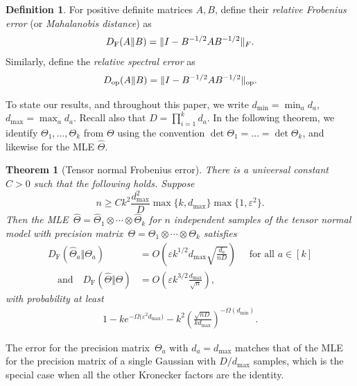 \documentclass[aos]{imsart}
\newtheorem{theorem}{Theorem}[section]
\theoremstyle{definition}
\newtheorem*{definition}{Definition}
\numberwithin{equation}{section}
\DeclareMathOperator{\op}{op}
\DeclarePairedDelimiter{\norm}{\lVert}{\rVert}
\newcommand{\htheta}{\widehat{\Theta}}
\newcommand{\ot}{\otimes}
\newcommand{\eps}{\varepsilon}
\newcommand{\DF}{D_{\operatorname{F}}}
\newcommand{\Dop}{D_{\operatorname{op}}}
\def\dmax{d_{\max}}
\begin{document}
\begin{definition}
For positive definite matrices $A, B$, define their \emph{relative Frobenius error} (or \emph{Mahalanobis distance}) as
\begin{align}\label{eq:def D_F}
  \DF(A \Vert B) = \norm{I - B^{-1/2} A B^{-1/2}}_F.
\end{align}
Similarly, define the \emph{relative spectral error} as
\begin{align}\label{eq:def D_op}
  \Dop(A \Vert B) = \norm{I - B^{-1/2} A B^{-1/2}}_{\op}.
\end{align}
\end{definition}

To state our results, and throughout this paper, we write $d_{\min} = \min_a d_a$, $\dmax = \max_a d_a$.
Recall also that $D = \prod_{i=1}^k d_a$.
In the following theorem, we identify $\Theta_1,\dots,\Theta_k$ from $\Theta$ using the convention $\det\Theta_1=\dots=\det\Theta_k$, and likewise for the MLE $\htheta$.
\newcommand{\TensorFrob}[2]{%
There is a universal constant~$C>0$ such that the following holds.
Suppose
\begin{#1}#2
  n \geq C k^2 \frac{\dmax^2}{D} \max\{k, \dmax\} \max\{1 , \eps^2\}.
\end{#1}
Then the MLE~$\htheta = \htheta_1 \ot \cdots \ot \htheta_k$ for $n$ independent samples of the tensor normal model with precision matrix~$\Theta = \Theta_1 \ot \cdots \ot \Theta_k$ satisfies
\begin{align*}
  \DF(\htheta_a\Vert\Theta_a) &= O\left(\eps k^{1/2} \dmax \sqrt{\frac{d_a}{n D}} \right) \quad\text{ for all } a\in[k] \\
\quad\text{and}\quad
  \DF(\htheta\Vert\Theta) &= O\left(\eps k^{3/2} \frac{\dmax}{\sqrt{n}}\right),
\end{align*}
with probability at least
\begin{align*}
  1 - k e^{-\Omega\bigl( \eps^2 \dmax \bigr)} - k^2 \left( \frac{\sqrt{nD}}{k \dmax} \right)^{-\Omega(d_{\min})}.
\end{align*}}

\begin{theorem}[Tensor normal Frobenius error]\label{thm:tensor-frobenius}
\TensorFrob{equation}{\label{eq:eps sqr assm}}
\end{theorem}

The error for the precision matrix~$\Theta_a$ with $d_a = \dmax$ matches that of the MLE for the precision matrix of a single Gaussian with $D/\dmax$ samples, which is the special case when all the other Kronecker factors are the identity.
\end{document}
